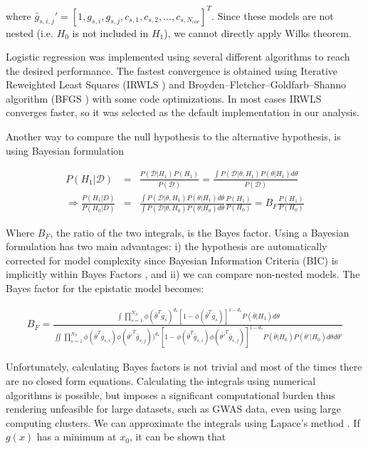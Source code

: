 where $\bar{g}_{s,i,j}' =  [1, g_{s,i}, g_{s,j}, c_{s,1} , c_{s,2}, ..., c_{s,N_{cov}} ]^T$. Since these models are not nested (i.e. $H_0$ is not included in $H_1$), we cannot directly apply Wilks theorem.

Logistic regression was implemented using several different algorithms to reach the desired performance. The fastest convergence is obtained using Iterative Reweighted Least Squares (IRWLS \cite{daubechies2010iteratively}) and Broyden–Fletcher–Goldfarb–Shanno algorithm (BFGS \cite{broyden1970convergence}) with some code optimizations. In most cases IRWLS converges faster, so it was selected as the default implementation in our analysis.

Another way to compare the null hypothesis to the alternative hypothesis, is using Bayesian formulation \cite{kass1995bayes,wakefield2009bayes}

\begin{eqnarray*}
P(H_1 | \mathcal{D}) & = & \frac{ P( \mathcal{D} | H_1) P(H_1) }{ P(\mathcal{D}) } = \frac{ \int{ P(\mathcal{D} | \theta , H_1) P( \theta | H_1)  d\theta } }{ P(\mathcal{D}) }  \\
\Rightarrow  \frac{ P(H_1 | D)  }{ P(H_0 | D)  } & = & \frac{ \int{ P(\mathcal{D} | \theta , H_1) P( \theta | H_1)  d\theta } }{\int{ P(\mathcal{D} | \theta , H_0 ) P( \theta | H_0)  d\theta } } \frac{ P(H_1) }{ P(H_0)  }  
=  B_F \frac{ P(H_1) }{ P(H_0)  }
\end{eqnarray*}

Where $B_F$, the ratio of the two integrals, is the Bayes factor. Using a Bayesian formulation has two main advantages: i) the hypothesis are automatically corrected for model complexity since Bayesian Information Criteria (BIC) is implicitly within Bayes Factors \cite{kass1993bayes}, and ii) we can compare non-nested models. The Bayes factor for the epistatic model becomes:

\begin{eqnarray}\label{eq:bf2}
B_F = \frac
{ \int{ \prod_{s=1}^{N_S}{ \phi( \bar{\theta}^T \bar{g}_s)^{d_s} [ 1-\phi( \bar{\theta}^T \bar{g}_s) ]^{1-d_s} } P( \bar{\theta} | H_1)  d\theta } }
{ \iint{ \prod_{s=1}^{N_S}{ 
\phi( \bar{\theta}^T \bar{g}_{s,i}) 
\phi( \bar{\theta'}^T \bar{g}_{s,j} ) )^{d_s} 
[ 1-\phi( \bar{\theta}^T \bar{g}_{s,i}) \phi( \bar{\theta'}^T \bar{g}_{s,j} ) ]^{1-d_s} } 
P( \bar{\theta} | H_0) 
P( \bar{\theta}' | H_0)  
d\theta d\theta' } }
\end{eqnarray}

Unfortunately, calculating Bayes factors is not trivial and most of the times there are no closed form equations. Calculating the integrals using numerical algorithms is possible, but  imposes a significant computational burden thus rendering unfeasible for large datasets, such as GWAS data, even using large computing clusters. We can approximate the integrals using Lapace's method  \cite{kass1995bayes}. If $g(x)$ has a minimum at $x_0$, it can be shown that

